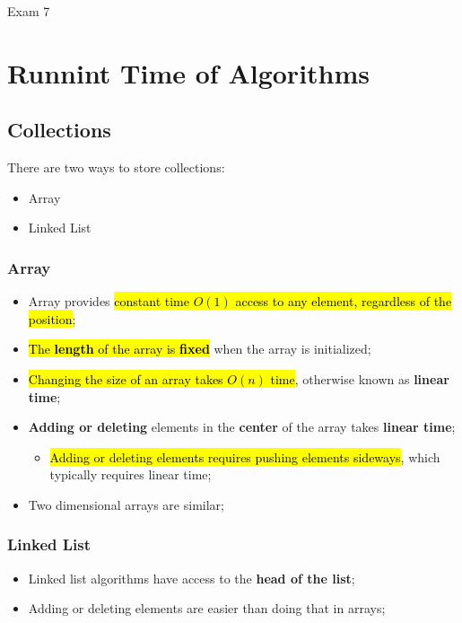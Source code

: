\documentclass{note}
\begin{document}
\begin{note}{Exam 7}
\section{Runnint Time of Algorithms}

    \subsection{Collections}

    There are two ways to store collections:
    \begin{itemize}
        \item Array
        \item Linked List
    \end{itemize}

        \subsubsection{Array}

        \begin{itemize}
            \item Array provides \hl{constant time $ O \left( 1 \right) $ access to any element, regardless of the position};
            \item \hl{The \textbf{length} of the array is \textbf{fixed}} when the array is initialized;
            \item \hl{Changing the size of an array takes $ O \left( n \right) $ time}, otherwise known as \textbf{linear time};
            \item \textbf{Adding or deleting} elements in the \textbf{center} of the array takes \textbf{linear time};
            \begin{itemize}
                \item \hl{Adding or deleting elements requires pushing elements sideways}, which typically requires linear time;
            \end{itemize}

            \item Two dimensional arrays are similar;
        \end{itemize}

        \subsubsection{Linked List}

        \begin{itemize}
            \item Linked list algorithms have access to the \textbf{head of the list};
            \item Adding or deleting elements are easier than doing that in arrays;
        \end{itemize}


\end{note}
\end{document}
